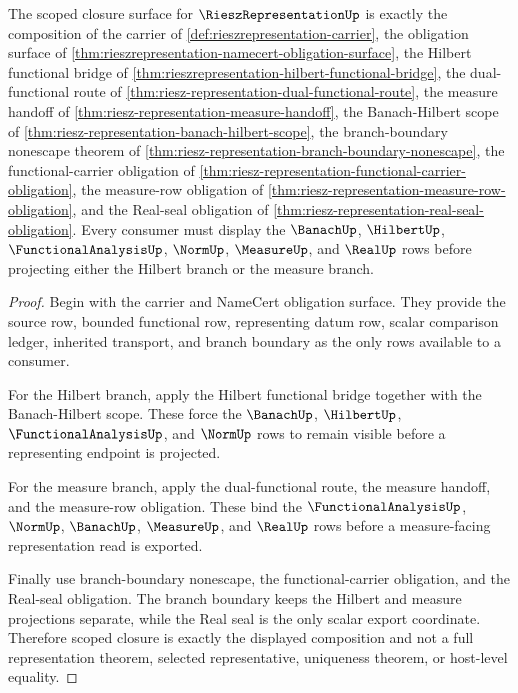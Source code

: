 \begin{theorem}
\label{thm:riesz-representation-scoped-closure-handoff}
The scoped closure surface for $\RieszRepresentationUp$ is exactly the composition of the carrier of \autoref{def:rieszrepresentation-carrier}, the obligation surface of \autoref{thm:rieszrepresentation-namecert-obligation-surface}, the Hilbert functional bridge of \autoref{thm:rieszrepresentation-hilbert-functional-bridge}, the dual-functional route of \autoref{thm:riesz-representation-dual-functional-route}, the measure handoff of \autoref{thm:riesz-representation-measure-handoff}, the Banach-Hilbert scope of \autoref{thm:riesz-representation-banach-hilbert-scope}, the branch-boundary nonescape theorem of \autoref{thm:riesz-representation-branch-boundary-nonescape}, the functional-carrier obligation of \autoref{thm:riesz-representation-functional-carrier-obligation}, the measure-row obligation of \autoref{thm:riesz-representation-measure-row-obligation}, and the Real-seal obligation of \autoref{thm:riesz-representation-real-seal-obligation}. Every consumer must display the $\BanachUp$, $\HilbertUp$, $\FunctionalAnalysisUp$, $\NormUp$, $\MeasureUp$, and $\RealUp$ rows before projecting either the Hilbert branch or the measure branch.
\end{theorem}
\begin{proof}
Begin with the carrier and NameCert obligation surface. They provide the source row, bounded functional row, representing datum row, scalar comparison ledger, inherited transport, and branch boundary as the only rows available to a consumer.

For the Hilbert branch, apply the Hilbert functional bridge together with the Banach-Hilbert scope. These force the $\BanachUp$, $\HilbertUp$, $\FunctionalAnalysisUp$, and $\NormUp$ rows to remain visible before a representing endpoint is projected.

For the measure branch, apply the dual-functional route, the measure handoff, and the measure-row obligation. These bind the $\FunctionalAnalysisUp$, $\NormUp$, $\BanachUp$, $\MeasureUp$, and $\RealUp$ rows before a measure-facing representation read is exported.

Finally use branch-boundary nonescape, the functional-carrier obligation, and the Real-seal obligation. The branch boundary keeps the Hilbert and measure projections separate, while the Real seal is the only scalar export coordinate. Therefore scoped closure is exactly the displayed composition and not a full representation theorem, selected representative, uniqueness theorem, or host-level equality.
\end{proof}

